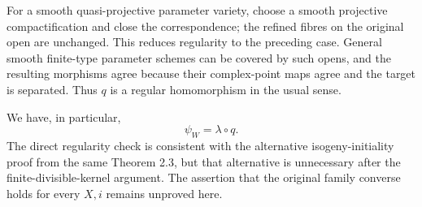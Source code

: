 For a smooth quasi-projective parameter variety, choose a
smooth projective compactification and close the correspondence;
the refined fibres on the original open are unchanged. This
reduces regularity to the preceding case. General smooth
finite-type parameter schemes can be covered by such opens,
and the resulting morphisms agree because their complex-point
maps agree and the target is separated. Thus $q$ is a regular
homomorphism in the usual sense.

We have, in particular,
\[
                    \psi_W=\lambda\circ q.
\]
The direct regularity check is consistent with the alternative
isogeny-initiality proof from the same Theorem 2.3, but that
alternative is unnecessary after the finite-divisible-kernel
argument. The assertion that the original family converse
holds for every $X,i$ remains unproved here.
